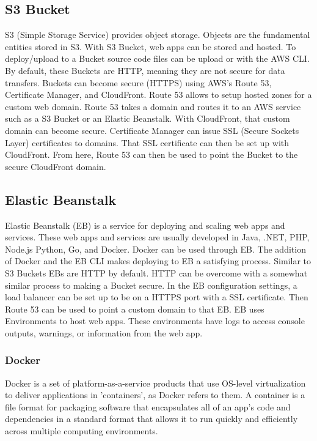 \subsection{S3 Bucket}
S3 (Simple Storage Service) provides object storage. Objects are the fundamental entities stored in S3. With S3 Bucket, web apps can be stored and hosted. To deploy/upload to a Bucket source code files can be upload or with the AWS CLI. By default, these Buckets are HTTP, meaning they are not secure for data transfers. Buckets can become secure (HTTPS) using AWS's Route 53, Certificate Manager, and CloudFront. Route 53 allows to setup hosted zones for a custom web domain. Route 53 takes a domain and routes it to an AWS service such as a S3 Bucket or an Elastic Beanstalk. With CloudFront, that custom domain can become secure. Certificate Manager can issue SSL (Secure Sockets Layer) certificates to domains. That SSL certificate can then be set up with CloudFront. From here, Route 53 can then be used to point the Bucket to the secure CloudFront domain.

\subsection{Elastic Beanstalk}
Elastic Beanstalk (EB) is a service for deploying and scaling web apps and services. These web apps and services are usually developed in Java, .NET, PHP, Node.js Python, Go, and Docker. Docker can be used through EB. The addition of Docker and the EB CLI makes deploying to EB a satisfying process. Similar to S3 Buckets EBs are HTTP by default. HTTP can be overcome with a somewhat similar process to making a Bucket secure. In the EB configuration settings, a load balancer can be set up to be on a HTTPS port with a SSL certificate. Then Route 53 can be used to point a custom domain to that EB. EB uses Environments to host web apps. These environments have logs to access console outputs, warnings, or information from the web app.

\subsubsection{Docker}
Docker is a set of platform-as-a-service products that use OS-level virtualization to deliver applications in 'containers', as Docker refers to them. A container is a file format for packaging software that encapsulates all of an app's code and dependencies in a standard format that allows it to run quickly and efficiently across multiple computing environments.

